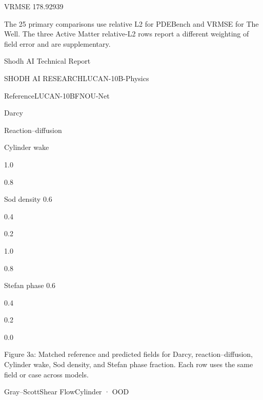 \documentclass[11pt]{article}
\begin{document}
\quad VRMSE 178.92939\par

The 25 primary comparisons use relative L2 for PDEBench and VRMSE for The Well. The three
Active Matter relative-L2 rows report a different weighting of field error and are supplementary.





\noindent Shodh AI Technical Report\par




\noindent SHODH AI RESEARCH\quad LUCAN-10B-Physics\par




\noindent Reference\quad LUCAN-10B\quad FNO\quad U-Net\par





Darcy




Reaction–diffusion




Cylinder wake




1.0

0.8


Sod density
0.6

0.4

0.2



\par


1.0

0.8




Stefan phase
0.6

0.4

0.2

0.0

\par





Figure 3a: Matched reference and predicted fields for Darcy, reaction–diffusion, Cylinder wake,
Sod density, and Stefan phase fraction. Each row uses the same field or case across models.

\noindent Gray–Scott\quad Shear Flow\quad Cylinder · OOD\par
\end{document}
